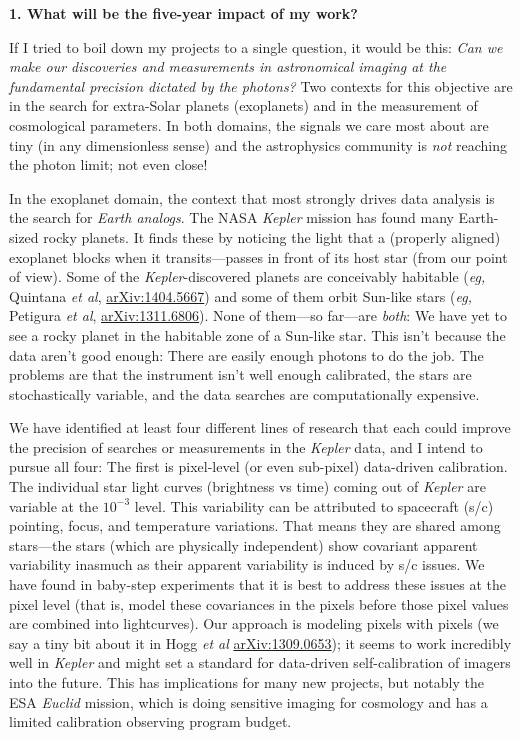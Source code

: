 \documentclass[11pt, letterpaper]{article}
\newcommand{\arxiv}[1]{\href{http://arxiv.org/abs/#1}{arXiv:#1}}
\begin{document}
\sloppy\sloppypar

\noindent\textbf{1. What will be the five-year impact of my work?}
\smallskip

If I tried to boil down my projects to a single question, it would be
this:
\emph{Can we make our discoveries and measurements in astronomical imaging
at the fundamental precision dictated by the photons?}
Two contexts for this objective are in the search for extra-Solar planets
(exoplanets) and in the measurement of cosmological parameters.
In both domains, the signals we care most about are tiny (in any
dimensionless sense) and the astrophysics community is \emph{not}
reaching the photon limit; not even close!

In the exoplanet domain, the context that most strongly drives data
analysis is the search for \emph{Earth analogs}.
The NASA \textsl{Kepler} mission has
found many Earth-sized rocky planets.
It finds these by noticing the light that a
(properly aligned) exoplanet blocks when it transits---passes in front
of its host star (from our point of view).
Some of the \textsl{Kepler}-discovered planets are conceivably habitable
(\textit{eg,} Quintana \textit{et al}, \arxiv{1404.5667})
and some of them orbit Sun-like stars
(\textit{eg,} Petigura \textit{et al}, \arxiv{1311.6806}).
None of them---so far---are \emph{both}: We have yet to see a rocky planet in the
habitable zone of a Sun-like star.
This isn't because the data aren't good enough:
There are easily enough photons to do the job.
The problems are that the instrument isn't well enough calibrated, the
stars are stochastically variable, and the data searches are
computationally expensive.

We have identified at least four different lines of research that each
could improve the precision of searches or measurements in the
\textsl{Kepler} data, and I intend to pursue all four:
The first is pixel-level (or even sub-pixel) data-driven calibration.
The individual star light curves (brightness vs time) coming out of
\textsl{Kepler} are variable at the $10^{-3}$ level.
This variability can be attributed to spacecraft (s/c) pointing,
focus, and temperature variations.
That means they are shared among stars---the stars (which are
physically independent) show covariant apparent variability inasmuch as their
apparent variability is induced by s/c issues.
We have found in baby-step experiments that it is best to address
these issues at the pixel level (that is, model these covariances in
the pixels before those pixel values are combined into lightcurves).
Our approach is modeling pixels with pixels
(we say a tiny bit about it in Hogg \textit{et al} \arxiv{1309.0653});
it seems to work
incredibly well in \textsl{Kepler} and might set a standard for
data-driven self-calibration of imagers into the future.
This has implications for many new projects, but notably the ESA
\textsl{Euclid} mission, which is doing sensitive imaging for
cosmology and has a limited calibration observing program budget.
\end{document}
